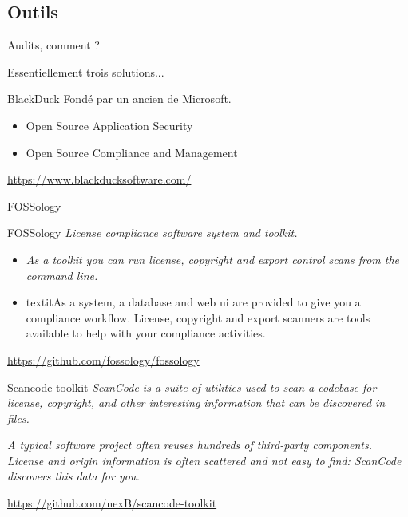 \documentclass{beamer}
\begin{document}
\subsection{Outils}

\begin{frame}{Audits, comment ?}

Essentiellement trois solutions...

\end{frame}


\begin{frame}{BlackDuck}
  Fondé par un ancien de Microsoft.

  \begin{itemize}
  \item Open Source Application Security
  \item Open Source Compliance and Management
  \end{itemize}

\url{https://www.blackducksoftware.com/}
\end{frame}



\begin{frame}{FOSSology}
\begin{block}{FOSSology}
\textit{License compliance software system and toolkit.}
\end{block}
\begin{itemize}
\item \textit{As a toolkit you can run license, copyright and export control scans from the command line.}
\item textit{As a system, a database and web ui are provided to give you a compliance workflow. License, copyright and export scanners are tools available to help with your compliance activities.}
\end{itemize}
\url{https://github.com/fossology/fossology}
\end{frame}


\begin{frame}[plain]%
%  
\end{frame}



\begin{frame}{Scancode toolkit}
\textit{ ScanCode is a suite of utilities used to scan a codebase for license, copyright, and other interesting information that can be discovered in files.}

\textit{A typical software project often reuses hundreds of third-party components. License and origin information is often scattered and not easy to find: ScanCode discovers this data for you.}

\url{https://github.com/nexB/scancode-toolkit}
\end{frame}
\end{document}
